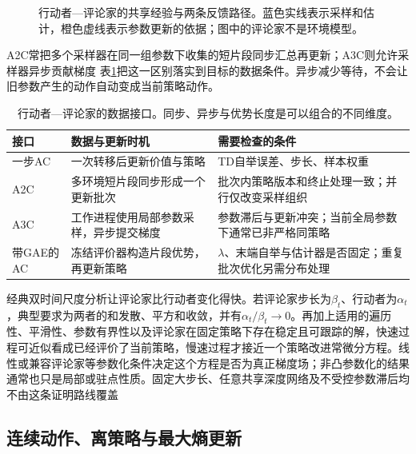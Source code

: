 \begin{figure}[t]
  \centering
  
  \caption{行动者—评论家的共享经验与两条反馈路径。蓝色实线表示采样和估计，橙色虚线表示参数更新的依据；图中的评论家不是环境模型。}
  \label{fig:rl-learning-actor-critic}
\end{figure}

A2C常把多个采样器在同一组参数下收集的短片段同步汇总再更新；A3C则允许采样器异步贡献梯度
表\ref{tab:rl-learning-ac-interfaces}把这一区别落实到目标的数据条件。异步减少等待，不会让旧参数产生的动作自动变成当前策略动作。

\begin{table}[t]
  \centering
  \small
  \begin{tabularx}{\linewidth}{>{\raggedright\arraybackslash}p{21mm} >{\raggedright\arraybackslash}X >{\raggedright\arraybackslash}X}
    \toprule
    接口 & 数据与更新时机 & 需要检查的条件 \\
    \midrule
    一步AC & 一次转移后更新价值与策略 & TD自举误差、步长、样本权重 \\
    A2C & 多环境短片段同步形成一个更新批次 & 批次内策略版本和终止处理一致；并行仅改变采样组织 \\
    A3C & 工作进程使用局部参数采样，异步提交梯度 & 参数滞后与更新冲突；当前全局参数下通常已非严格同策略 \\
    带GAE的AC & 冻结评价器构造片段优势，再更新策略 & $\lambda$、末端自举与估计器是否固定；重复批次优化另需分布处理 \\
    \bottomrule
  \end{tabularx}
  \caption{行动者—评论家的数据接口。同步、异步与优势长度是可以组合的不同维度。}
  \label{tab:rl-learning-ac-interfaces}
\end{table}

经典双时间尺度分析让评论家比行动者变化得快。若评论家步长为$\beta_t$、行动者为$\alpha_t$，典型要求为两者的和发散、平方和收敛，并有$\alpha_t/\beta_t\to0$。再加上适用的遍历性、平滑性、参数有界性以及评论家在固定策略下存在稳定且可跟踪的解，快速过程可近似看成已经评价了当前策略，慢速过程才接近一个策略改进常微分方程。线性或兼容评论家等参数化条件决定这个方程是否为真正梯度场；非凸参数化的结果通常也只是局部或驻点性质。固定大步长、任意共享深度网络及不受控参数滞后均不由这条证明路线覆盖

\subsection{连续动作、离策略与最大熵更新}
\label{sec:rl-learning-continuous-soft}

